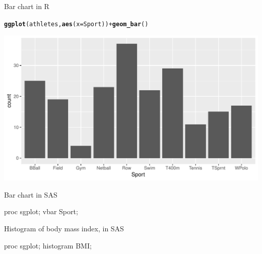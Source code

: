 \documentclass[unknownkeysallowed]{beamer}\usepackage[]{graphicx}\usepackage[]{color}
\makeatletter
\def\maxwidth{ %
  \ifdim\Gin@nat@width>\linewidth
    \linewidth
  \else
    \Gin@nat@width
  \fi
}
\newcommand{\hlopt}[1]{\textcolor[rgb]{0,0,0}{#1}}%
\newcommand{\hlstd}[1]{\textcolor[rgb]{0.345,0.345,0.345}{#1}}%
\newcommand{\hlkwc}[1]{\textcolor[rgb]{0.333,0.667,0.333}{#1}}%
\newcommand{\hlkwd}[1]{\textcolor[rgb]{0.737,0.353,0.396}{\textbf{#1}}}%
\newenvironment{kframe}{%
 \def\at@end@of@kframe{}%
 \ifinner\ifhmode%
  \def\at@end@of@kframe{\end{minipage}}%
  \begin{minipage}{\columnwidth}%
 \fi\fi%
 \def\FrameCommand##1{\hskip\@totalleftmargin \hskip-\fboxsep
 \colorbox{shadecolor}{##1}\hskip-\fboxsep
     \hskip-\linewidth \hskip-\@totalleftmargin \hskip\columnwidth}%
 \MakeFramed {\advance\hsize-\width
   \@totalleftmargin\z@ \linewidth\hsize
   \@setminipage}}%
 {\par\unskip\endMakeFramed%
 \at@end@of@kframe}
\newenvironment{knitrout}{}{} %
\makeatother
\begin{document}
\begin{frame}[fragile]{Bar chart in R}
  
\begin{knitrout}
\color{fgcolor}\begin{kframe}
\begin{alltt}
\hlkwd{ggplot}\hlstd{(athletes,}\hlkwd{aes}\hlstd{(}\hlkwc{x}\hlstd{=Sport))}\hlopt{+}\hlkwd{geom_bar}\hlstd{()}
\end{alltt}
\end{kframe}
\includegraphics[width=\maxwidth]{figure/unnamed-chunk-24-1} 

\end{knitrout}
  
\end{frame}

\begin{frame}[fragile]{Bar chart in SAS}
  
  \begin{Sascode}[store=gd]
proc sgplot;
  vbar Sport;
  \end{Sascode}
  
  
\end{frame}

\begin{frame}[fragile]{Histogram of body mass index, in SAS}
  
  \begin{Sascode}[store=ge]
proc sgplot;
  histogram BMI;
  \end{Sascode}
  

  
\end{frame}
\end{document}
